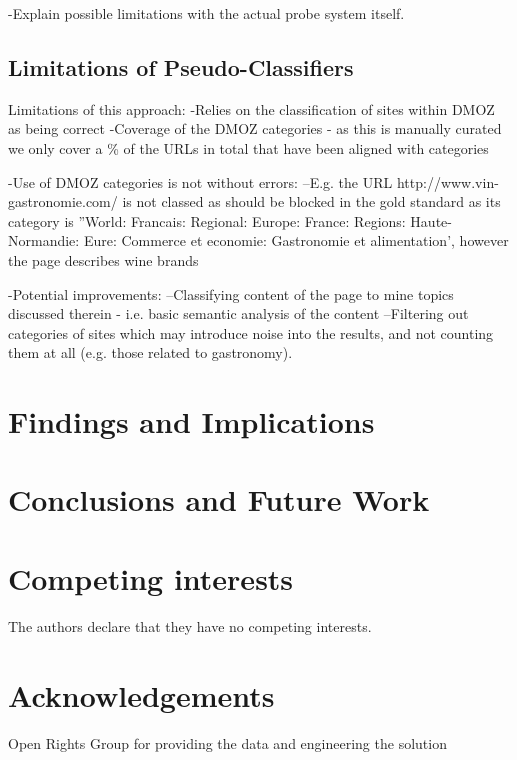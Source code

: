 \documentclass{bmcart}
\begin{document}
-Explain possible limitations with the actual probe system itself.


\subsection*{Limitations of Pseudo-Classifiers}
Limitations of this approach:
-Relies on the classification of sites within DMOZ as being correct
-Coverage of the DMOZ categories - as this is manually curated we only cover a \% of the URLs in total that have been aligned with categories

-Use of DMOZ categories is not without errors:
--E.g. the URL http://www.vin-gastronomie.com/ is not classed as should be blocked in the gold standard as its category is ''World: Francais: Regional: Europe: France: Regions: Haute-Normandie: Eure: Commerce et economie: Gastronomie et alimentation', however the page describes wine brands

-Potential improvements:
--Classifying content of the page to mine topics discussed therein - i.e. basic semantic analysis of the content
--Filtering out categories of sites which may introduce noise into the results, and not counting them at all (e.g. those related to gastronomy).


\section*{Findings and Implications}


\section*{Conclusions and Future Work}





\begin{backmatter}

\section*{Competing interests}
  The authors declare that they have no competing interests.

\section*{Acknowledgements}
Open Rights Group for providing the data and engineering the solution





\end{backmatter}
\end{document}
